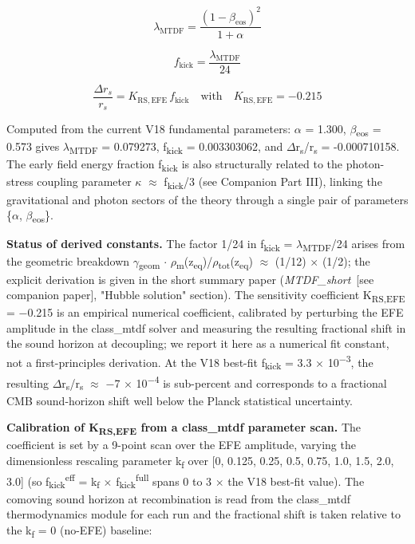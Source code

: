 \documentclass[11pt,a4paper]{article}
\begin{document}
\[
    \lambda_{\mathrm{MTDF}} = \frac{(1-\beta_{\mathrm{eos}})^2}{1+\alpha}
  \]

\[
    f_{\mathrm{kick}} = \frac{\lambda_{\mathrm{MTDF}}}{24}
  \]

\[
    \frac{\Delta r_s}{r_s} = K_{\mathrm{RS,EFE}} \, f_{\mathrm{kick}} \quad\mathrm{with}\quad K_{\mathrm{RS,EFE}}=-0.215
  \]

Computed from the current V18 fundamental parameters: $\alpha$ = 1.300, $\beta$\textsubscript{eos} = 0.573 gives $\lambda$\textsubscript{MTDF} = 0.079273, f\textsubscript{kick} = 0.003303062, and $\Delta$r\textsubscript{s}/r\textsubscript{s} = -0.000710158. The early field energy fraction f\textsubscript{kick} is also structurally related to the photon-stress coupling parameter $\kappa$ $\approx$ f\textsubscript{kick}/3 (see Companion Part III), linking the gravitational and photon sectors of the theory through a single pair of parameters \{$\alpha$, $\beta$\textsubscript{eos}\}.

\textbf{Status of derived constants.} The factor 1/\allowbreak{}24 in f\textsubscript{kick} = $\lambda$\textsubscript{MTDF}/24 arises from the geometric breakdown $\gamma$\textsubscript{geom} $\cdot$ $\rho$\textsubscript{m}(z\textsubscript{eq})/$\rho$\textsubscript{tot}(z\textsubscript{eq}) $\approx$ (1/\allowbreak{}12) $\times$ (1/\allowbreak{}2); the explicit derivation is given in the short summary paper (\textit{MTDF\_\allowbreak{}short}~[see companion paper], "Hubble solution" section). The sensitivity coefficient K\textsubscript{RS,EFE} = $-$0.215 is an empirical numerical coefficient, calibrated by perturbing the EFE amplitude in the class\_\allowbreak{}mtdf solver and measuring the resulting fractional shift in the sound horizon at decoupling; we report it here as a numerical fit constant, not a first-principles derivation. At the V18 best-fit f\textsubscript{kick} = 3.3 $\times$ 10\textsuperscript{$-$3}, the resulting $\Delta$r\textsubscript{s}/r\textsubscript{s} $\approx$ $-$7 $\times$ 10\textsuperscript{$-$4} is sub-percent and corresponds to a fractional CMB sound-horizon shift well below the Planck statistical uncertainty.

\textbf{Calibration of K\textsubscript{RS,EFE} from a class\_\allowbreak{}mtdf parameter scan.} The coefficient is set by a 9-point scan over the EFE amplitude, varying the dimensionless rescaling parameter k\textsubscript{f} over [0, 0.125, 0.25, 0.5, 0.75, 1.0, 1.5, 2.0, 3.0] (so f\textsubscript{kick}\textsuperscript{eff} = k\textsubscript{f} $\times$ f\textsubscript{kick}\textsuperscript{full} spans 0 to 3 $\times$ the V18 best-fit value). The comoving sound horizon at recombination is read from the class\_\allowbreak{}mtdf thermodynamics module for each run and the fractional shift is taken relative to the k\textsubscript{f} = 0 (no-EFE) baseline:
\end{document}
